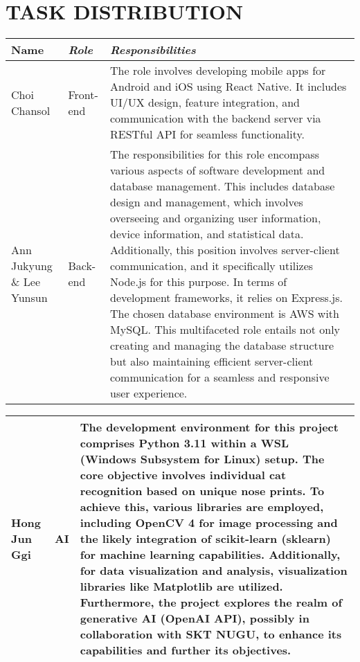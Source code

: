 \documentclass[conference]{IEEEtran}
\begin{document}
\section{TASK DISTRIBUTION}
\begin{table}[!htbp]\normalsize
\begin{center}
\begin{tabular}{|p{1.2cm}|p{1.9cm}|p{4.5cm}|}
\hline
\textbf{Name} & \textbf{\textit{Role}}& \textbf{\textit{Responsibilities}}\\
\hline
Choi Chansol & Front-end &
The role involves developing mobile apps for Android and iOS using React Native. It includes UI/UX design, feature integration, and communication with the backend server via RESTful API for seamless functionality.
\\ \hline
Ann Jukyung \& Lee Yunsun & Back-end &
The responsibilities for this role encompass various aspects of software development and database management. This includes database design and management, which involves overseeing and organizing user information, device information, and statistical data. Additionally, this position involves server-client communication, and it specifically utilizes Node.js for this purpose. In terms of development frameworks, it relies on Express.js. The chosen database environment is AWS with MySQL. This multifaceted role entails not only creating and managing the database structure but also maintaining efficient server-client communication for a seamless and responsive user experience.
\\ \hline
\end{tabular}
\label{tab1}
\end{center}
\end{table}
\newpage
\begin{table}[!htbp]\normalsize
\begin{center}
\begin{tabular}{|p{1.2cm}|p{1.9cm}|p{4.5cm}|}
\hline
Hong Jun Ggi & AI &
The development environment for this project comprises Python 3.11 within a WSL (Windows Subsystem for Linux) setup. The core objective involves individual cat recognition based on unique nose prints. To achieve this, various libraries are employed, including OpenCV 4 for image processing and the likely integration of scikit-learn (sklearn) for machine learning capabilities. Additionally, for data visualization and analysis, visualization libraries like Matplotlib are utilized. Furthermore, the project explores the realm of generative AI (OpenAI API), possibly in collaboration with SKT NUGU, to enhance its capabilities and further its objectives.
\\ \hline
\end{tabular}
\label{tab2}
\end{center}
\end{table}
\end{document}
